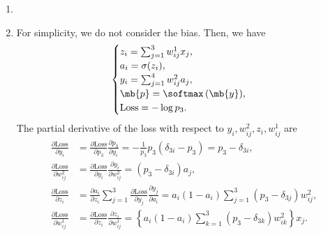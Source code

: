 \begin{exercise}
\begin{enumerate}
            \begin{solution}
                \begin{enumerate}
                    \item []
                    \item For simplicity, we do not consider the bias. Then, we have
                        \begin{align*}
                            \begin{cases}
                                z_i = \sum_{j=1}^3 w^1_{ij} x_j, \\
                                a_i = \sigma(z_i),               \\
                                y_i = \sum_{j=1}^4 w^2_{ij} a_j, \\
                                \mb{p} = \softmax\,(\mb{y}),     \\
                                \text{Loss} = - \log p_3.
                            \end{cases}
                        \end{align*}
                        The partial derivative of the loss with respect to $y_i, w^2_{ij}, z_i, w^1_{ij}$ are
                        \begin{align*}
                            \frac{\partial \text{Loss}}{\partial y_i}      & = \frac{\partial \text{Loss}}{\partial p_3} \frac{\partial p_3}{\partial y_i} = -\frac{1}{p_3} p_3(\delta_{3i} - p_3) = p_3 - \delta_{3i},                                           \\
                            \frac{\partial \text{Loss}}{\partial w^2_{ij}} & = \frac{\partial \text{Loss}}{\partial y_i} \frac{\partial y_i}{\partial w^2_{ij}} = (p_3 - \delta_{3i}) a_j,                                                                        \\
                            \frac{\partial \text{Loss}}{\partial z_i}      & = \frac{\partial a_i}{\partial z_i} \sum_{j=1}^3 \frac{\partial \text{Loss}}{\partial y_j} \frac{\partial y_j}{\partial a_i} = a_i(1-a_i) \sum_{j=1}^3 (p_3 - \delta_{3j}) w^2_{ij}, \\
                            \frac{\partial \text{Loss}}{\partial w^1_{ij}} & = \frac{\partial \text{Loss}}{\partial z_i} \frac{\partial z_i}{\partial w^1_{ij}} = \left\{a_i(1-a_i) \sum_{k=1}^3 (p_3 - \delta_{3k}) w^2_{ik}\right\} x_j.
                        \end{align*}



\end{enumerate}
\end{solution}
\end{enumerate}
\end{exercise}
